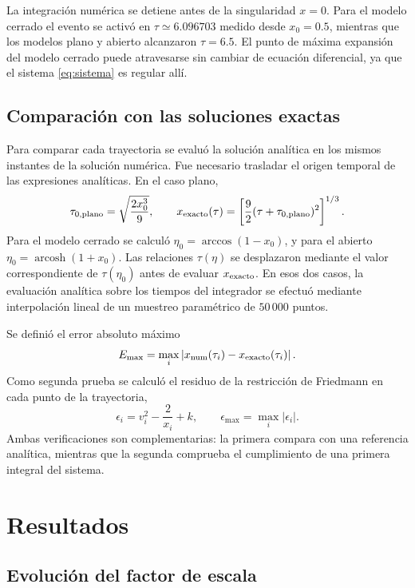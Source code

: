 \documentclass[letterpaper,11pt]{article}
\begin{document}
La integración numérica se detiene antes de la singularidad $x=0$. Para el modelo cerrado el evento se activó en $\tau\simeq6.096703$ medido desde $x_0=0.5$, mientras que los modelos plano y abierto alcanzaron $\tau=6.5$. El punto de máxima expansión del modelo cerrado puede atravesarse sin cambiar de ecuación diferencial, ya que el sistema \eqref{eq:sistema} es regular allí.

\subsection{Comparación con las soluciones exactas}

Para comparar cada trayectoria se evaluó la solución analítica en los mismos instantes de la solución numérica. Fue necesario trasladar el origen temporal de las expresiones analíticas. En el caso plano,
\begin{equation}
\tau_{0,\mathrm{plano}}=\sqrt{\frac{2x_0^3}{9}},\qquad
x_{\rm exacto}(\tau)=\left[\frac92(\tau+\tau_{0,\mathrm{plano}})^2\right]^{1/3}.
\end{equation}
Para el modelo cerrado se calculó $\eta_0=\arccos(1-x_0)$, y para el abierto $\eta_0=\operatorname{arcosh}(1+x_0)$. Las relaciones $\tau(\eta)$ se desplazaron mediante el valor correspondiente de $\tau(\eta_0)$ antes de evaluar $x_{\rm exacto}$. En esos dos casos, la evaluación analítica sobre los tiempos del integrador se efectuó mediante interpolación lineal de un muestreo paramétrico de $50\,000$ puntos.

Se definió el error absoluto máximo
\begin{equation}
E_{\max}=\max_i\left|x_{\rm num}(\tau_i)-x_{\rm exacto}(\tau_i)\right|.
\label{eq:error}
\end{equation}
Como segunda prueba se calculó el residuo de la restricción de Friedmann en cada punto de la trayectoria,
\begin{equation}
\epsilon_i=v_i^2-\frac{2}{x_i}+k,\qquad
\epsilon_{\max}=\max_i|\epsilon_i|.
\label{eq:residuo}
\end{equation}
Ambas verificaciones son complementarias: la primera compara con una referencia analítica, mientras que la segunda comprueba el cumplimiento de una primera integral del sistema.

\section{Resultados}

\subsection{Evolución del factor de escala}
\end{document}
